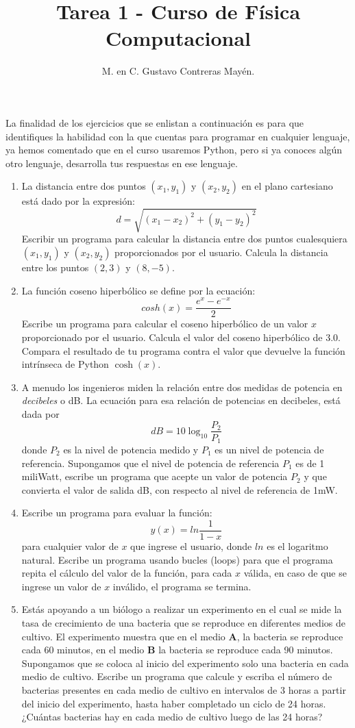 \documentclass[12pt]{article}
\author{M. en C. Gustavo Contreras May\'{e}n.}
\title{Tarea 1 - Curso de F\'{i}sica Computacional}
\date{ }
\begin{document}
\maketitle
\fontsize{14}{14}\selectfont
La finalidad de los ejercicios que se enlistan a continuaci\'{o}n es para que identifiques la habilidad con la que cuentas para programar en cualquier lenguaje, ya hemos comentado que en el curso usaremos Python, pero si ya conoces alg\'{u}n otro lenguaje, desarrolla tus respuestas en ese lenguaje.
\\
\begin{enumerate}
\item La distancia entre dos puntos $(x_{1},y_{1})$ y $(x_{2},y_{2})$ en el plano cartesiano est\'{a} dado por la expresi\'{o}n:
\[ d = \sqrt{(x_{1} - x_{2})^{2} + (y_{1} - y_{2})^{2}} \]
Escribir un programa para calcular la distancia entre dos puntos cualesquiera $(x_{1}, y_{1})$ y $(x_{2}, y_{2})$ proporcionados por el usuario. Calcula la distancia entre los puntos $(2,3)$ y $(8,-5)$.
\item La funci\'{o}n coseno hiperb\'{o}lico se define por la ecuaci\'{o}n:
\[ cosh(x) = \dfrac{e^{x} - e^{-x}}{2} \]
Escribe un programa para calcular el coseno hiperb\'{o}lico de un valor $x$ proporcionado por el usuario. Calcula el valor del coseno hiperb\'{o}lico de $3.0$. Compara el resultado de tu programa contra el valor que devuelve la funci\'{o}n intr\'{i}nseca de Python $\cosh(x)$.
\item A menudo los ingenieros miden la relaci\'{o}n entre dos medidas de potencia en \textit{decibeles} o dB. La ecuaci\'{o}n para esa relaci\'{o}n de potencias en decibeles, est\'{a} dada por
\[ dB = 10 \log_{10} \dfrac{P_{2}}{P_{1}} \]
donde $P_{2}$ es la nivel de potencia medido y $P_{1}$ es un nivel de potencia de referencia. Supongamos que el nivel de potencia de referencia $P_{1}$ es de 1 miliWatt, escribe un programa que acepte un valor de potencia $P_{2}$ y que convierta el valor de salida dB, con respecto al nivel de referencia de 1mW.
\item Escribe un programa para evaluar la funci\'{o}n:
\[ y(x) = ln \dfrac{1}{1-x} \]
para cualquier valor de $x$ que ingrese el usuario, donde $ln$ es el logaritmo natural. Escribe un programa usando bucles (loops) para que el programa repita el c\'{a}lculo del valor de la funci\'{o}n, para cada $x$ v\'{a}lida, en caso de que se ingrese un valor de $x$ inv\'{a}lido, el programa se termina.
\item Est\'{a}s apoyando a un bi\'{o}logo a realizar un experimento en el cual se mide la tasa de crecimiento de una bacteria que se reproduce en diferentes medios de cultivo. El experimento muestra que en el medio \textbf{A}, la bacteria se reproduce cada 60  minutos, en el medio \textbf{B} la bacteria se reproduce cada 90 minutos. Supongamos que se coloca al inicio del experimento solo una bacteria en cada medio de cultivo. Escribe un programa que calcule y escriba el n\'{u}mero de bacterias presentes en cada medio de cultivo en intervalos de 3 horas a partir del inicio del experimento, hasta haber completado un ciclo de 24 horas. ¿Cu\'{a}ntas bacterias hay en cada medio de cultivo luego de las 24 horas?

\end{enumerate}
\end{document}

